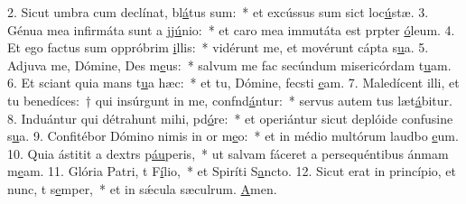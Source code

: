 2. Sicut umbra cum declínat, bl\uline{á}tus sum:~* et excússus sum sict loc\uline{ú}stæ.
3. Génua mea infirmáta sunt a jj\uline{ú}nio:~* et caro mea immutáta est prpter \uline{ó}leum.
4. Et ego factus sum oppróbrim \uline{i}llis:~* vidérunt me, et movérunt cápta s\uline{u}a.
5. Adjuva me, Dómine, Des m\uline{e}us:~* salvum me fac secúndum misericórdam t\uline{u}am.
6. Et sciant quia mans t\uline{u}a hæc:~* et tu, Dómine, fecsti \uline{e}am.
7. Maledícent illi, et tu benedíces:~† qui insúrgunt in me, confnd\uline{á}ntur:~* servus autem tus læt\uline{á}bitur.
8. Induántur qui détrahunt mihi, pd\uline{ó}re:~* et operiántur sicut deplóide confusine s\uline{u}a.
9. Confitébor Dómino nimis in or m\uline{e}o:~* et in médio multórum laudbo \uline{e}um.
10. Quia ástitit a dextrs p\uline{áu}peris,~* ut salvam fáceret a persequéntibus ánmam m\uline{e}am.
11. Glória Patri, t F\uline{í}lio,~* et Spiríti S\uline{a}ncto.
12. Sicut erat in princípio, et nunc, t s\uline{e}mper,~* et in sǽcula sæculrum. \uline{A}men.
